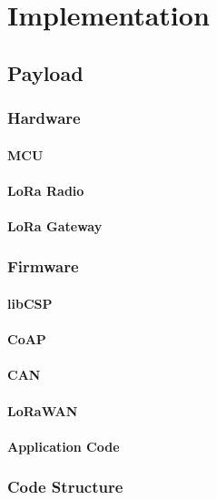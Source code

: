 \section{Implementation}
\label{sec:implementation}

\subsection{Payload}
\label{sec:paylod}
\subsubsection{Hardware}
\paragraph*{MCU} 
\paragraph*{LoRa Radio} 
\paragraph*{LoRa Gateway} 

\subsubsection{Firmware}
\paragraph*{libCSP} 
\paragraph*{CoAP}  %
\paragraph*{CAN} 
\paragraph*{LoRaWAN} 
\paragraph*{Application Code}
\subsubsection{Code Structure}

